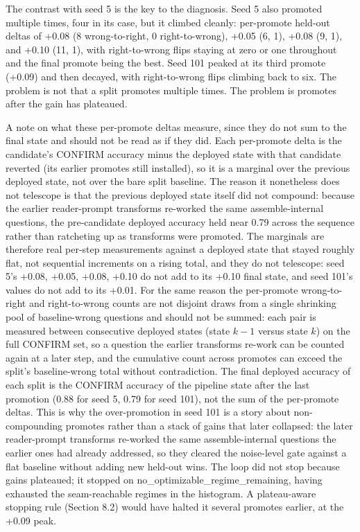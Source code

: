 The contrast with seed 5 is the key to the diagnosis. Seed 5 also promoted multiple times, four in its case, but it climbed cleanly: per-promote held-out deltas of +0.08 (8 wrong-to-right, 0 right-to-wrong), +0.05 (6, 1), +0.08 (9, 1), and +0.10 (11, 1), with right-to-wrong flips staying at zero or one throughout and the final promote being the best. Seed 101 peaked at its third promote (+0.09) and then decayed, with right-to-wrong flips climbing back to six. The problem is not that a split promotes multiple times. The problem is promotes after the gain has plateaued.

A note on what these per-promote deltas measure, since they do not sum to the final state and should not be read as if they did. Each per-promote delta is the candidate's CONFIRM accuracy minus the deployed state with that candidate reverted (its earlier promotes still installed), so it is a marginal over the previous deployed state, not over the bare split baseline. The reason it nonetheless does not telescope is that the previous deployed state itself did not compound: because the earlier reader-prompt transforms re-worked the same assemble-internal questions, the pre-candidate deployed accuracy held near 0.79 across the sequence rather than ratcheting up as transforms were promoted. The marginals are therefore real per-step measurements against a deployed state that stayed roughly flat, not sequential increments on a rising total, and they do not telescope: seed 5's +0.08, +0.05, +0.08, +0.10 do not add to its +0.10 final state, and seed 101's values do not add to its +0.01. For the same reason the per-promote wrong-to-right and right-to-wrong counts are not disjoint draws from a single shrinking pool of baseline-wrong questions and should not be summed: each pair is measured between consecutive deployed states (state $k\!-\!1$ versus state $k$) on the full CONFIRM set, so a question the earlier transforms re-work can be counted again at a later step, and the cumulative count across promotes can exceed the split's baseline-wrong total without contradiction. The final deployed accuracy of each split is the CONFIRM accuracy of the pipeline state after the last promotion (0.88 for seed 5, 0.79 for seed 101), not the sum of the per-promote deltas. This is why the over-promotion in seed 101 is a story about non-compounding promotes rather than a stack of gains that later collapsed: the later reader-prompt transforms re-worked the same assemble-internal questions the earlier ones had already addressed, so they cleared the noise-level gate against a flat baseline without adding new held-out wins. The loop did not stop because gains plateaued; it stopped on no\_optimizable\_regime\_remaining, having exhausted the seam-reachable regimes in the histogram. A plateau-aware stopping rule (Section 8.2) would have halted it several promotes earlier, at the +0.09 peak.

